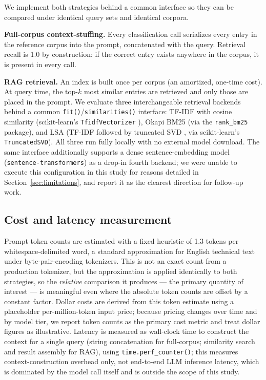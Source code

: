 \documentclass[11pt]{article}
\begin{document}
We implement both strategies behind a common interface so they can be compared under identical query sets and identical corpora.

\textbf{Full-corpus context-stuffing.} Every classification call serializes every entry in the reference corpus into the prompt, concatenated with the query. Retrieval recall is 1.0 by construction: if the correct entry exists anywhere in the corpus, it is present in every call.

\textbf{RAG retrieval.} An index is built once per corpus (an amortized, one-time cost). At query time, the top-$k$ most similar entries are retrieved and only those are placed in the prompt. We evaluate three interchangeable retrieval backends behind a common \texttt{fit()}/\texttt{similarities()} interface: TF-IDF with cosine similarity (scikit-learn's \texttt{TfidfVectorizer} \citep{scikit-learn}), Okapi BM25 \citep{robertson2009bm25} (via the \texttt{rank\_bm25} package), and LSA (TF-IDF followed by truncated SVD \citep{deerwester1990lsa}, via scikit-learn's \texttt{TruncatedSVD}). All three run fully locally with no external model download. The same interface additionally supports a dense sentence-embedding model (\texttt{sentence-transformers}) as a drop-in fourth backend; we were unable to execute this configuration in this study for reasons detailed in Section~\ref{sec:limitations}, and report it as the clearest direction for follow-up work.

\subsection{Cost and latency measurement}

Prompt token counts are estimated with a fixed heuristic of 1.3 tokens per whitespace-delimited word, a standard approximation for English technical text under byte-pair-encoding tokenizers. This is not an exact count from a production tokenizer, but the approximation is applied identically to both strategies, so the \emph{relative} comparison it produces --- the primary quantity of interest --- is meaningful even where the absolute token counts are offset by a constant factor. Dollar costs are derived from this token estimate using a placeholder per-million-token input price; because pricing changes over time and by model tier, we report token counts as the primary cost metric and treat dollar figures as illustrative. Latency is measured as wall-clock time to construct the context for a single query (string concatenation for full-corpus; similarity search and result assembly for RAG), using \texttt{time.perf\_counter()}; this measures context-construction overhead only, not end-to-end LLM inference latency, which is dominated by the model call itself and is outside the scope of this study.
\end{document}
